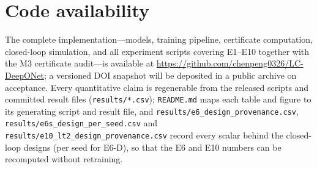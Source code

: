 \documentclass[11pt,sagev,times]{sagej}
\begin{document}
\section*{Code availability}
The complete implementation---models, training pipeline, certificate
computation, closed-loop simulation, and all experiment scripts covering
E1--E10 together with the M3 certificate audit---is available at
\url{https://github.com/chenpeng0326/LC-DeepONet}; a versioned DOI
snapshot will be deposited in a public archive on acceptance. Every quantitative claim is
regenerable from the released scripts and committed result files
(\texttt{results/*.csv}); \texttt{README.md} maps each table and figure to
its generating script and result file, and
\texttt{results/e6\_design\_provenance.csv},
\texttt{results/e6s\_design\_per\_seed.csv} and
\texttt{results/e10\_lt2\_design\_provenance.csv} record every scalar behind
the closed-loop designs (per seed for E6-D), so that the E6 and E10 numbers
can be recomputed without retraining.
\end{document}
